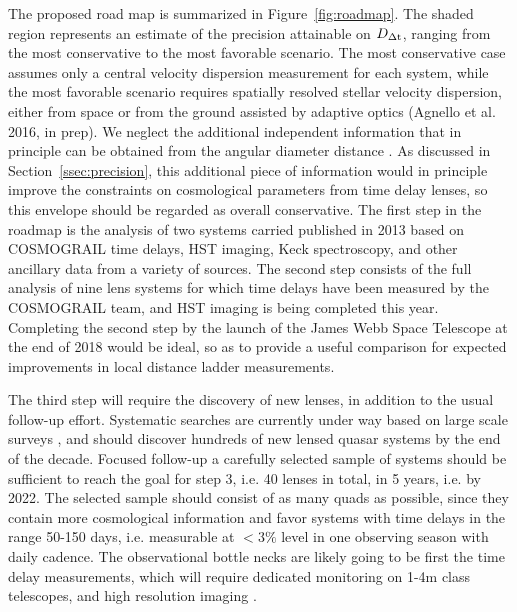 The proposed road map is summarized in Figure~\ref{fig:roadmap}. The
shaded region represents an estimate of the precision attainable on
$D_{\Delta{\rm t}}$, ranging from the most conservative to the most favorable
scenario. The most conservative case assumes only a central velocity
dispersion measurement for each system, while the most favorable
scenario requires spatially resolved stellar velocity dispersion,
either from space or from the ground assisted by adaptive optics
(Agnello et al. 2016, in prep). We neglect the additional independent
information that in principle can be obtained from the angular
diameter distance \citep{JeeKomatsuSuyu2015,JeeEtal2016}.  As
discussed in Section~\ref{ssec:precision}, this additional piece of
information would in principle improve the constraints on cosmological
parameters from time delay lenses, so this envelope should be regarded
as overall conservative. The first step in the roadmap is the analysis
of two systems carried published in 2013 based on COSMOGRAIL time
delays, HST imaging, Keck spectroscopy, and other ancillary data from
a variety of sources. The second step consists of the full analysis of
nine lens systems for which time delays have been measured by the
COSMOGRAIL team, and HST imaging is being completed this
year. Completing the second step by the launch of the James Webb Space
Telescope at the end of 2018 would be ideal, so as to provide a useful
comparison for expected improvements in local distance ladder
measurements.

The third step will require the discovery of new lenses, in addition
to the usual follow-up effort. Systematic searches are currently under
way based on large scale surveys \citep{Agn++15,Mor++16}, and should
discover hundreds of new lensed quasar systems \citep{O+M10} by the
end of the decade. Focused follow-up a carefully selected sample of
systems should be sufficient to reach the goal for step 3, i.e. 40
lenses in total, in 5 years, i.e. by 2022. The selected sample should
consist of as many quads as possible, since they contain more
cosmological information and favor systems with time delays in the
range 50-150 days, i.e. measurable at $<3\%$ level in one observing
season with daily cadence. The observational bottle necks are likely
going to be first the time delay measurements, which will require
dedicated monitoring on 1-4m class telescopes, and high resolution
imaging \citep{Tre++13}.

